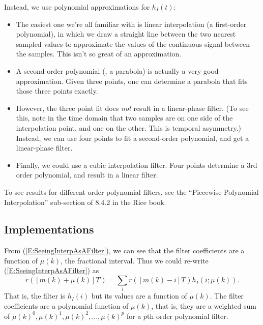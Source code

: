 Instead, we use polynomial approximations for $h_I(t)$:
\begin{itemize}
  \item  The easiest
    one we're all familiar with is linear interpolation (a first-order
    polynomial), in which we draw a straight line between the two
    nearest sampled values to approximate the values of the continuous
    signal between the samples. This isn't so great of an approximation.
  \item A second-order polynomial (\ie, a parabola) is actually a
    very good approximation.  Given three points, one can determine a
    parabola that fits those three points exactly.
  \item However, the three point fit does \emph{not} result in a
    linear-phase filter.  (To see this, note in the time domain that
    two samples are on one side of the interpolation point, and one on
    the other.  This is temporal asymmetry.)  Instead, we can use four
    points to fit a second-order polynomial, and get a linear-phase
    filter.
  \item Finally, we could use a cubic interpolation filter.  Four points
    determine a 3rd order polynomial, and result in a linear filter.
\end{itemize}
To see results for different order polynomial filters, see the ``Piecewise Polynomial Interpolation'' sub-section of 8.4.2 in the Rice book.

\subsection{Implementations}


From (\ref{E:SeeingInterpAsAFilter}), we can see that the filter
coefficients are a function of $\mu(k)$, the fractional interval.
Thus we could re-write (\ref{E:SeeingInterpAsAFilter}) as
\begin{equation} \label{E:SeeingInterpAsAFilter_v2}
  r([m(k) + \mu(k)]T_{}) = \sum_i r([m(k)-i]T_{}) h_I(i; \mu(k)).
\end{equation}
That is, the filter is $h_I(i)$ but its values are a function of
$\mu(k)$.  The filter coefficients are a polynomial function of
$\mu(k)$, that is, they are a weighted sum of $\mu(k)^0, \mu(k)^1,
\mu(k)^2, \ldots, \mu(k)^p$ for a $p$th order polynomial filter.


